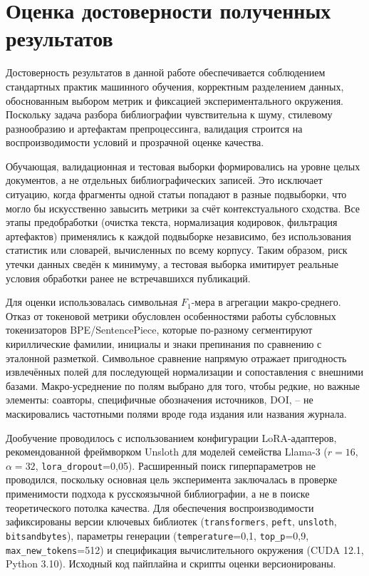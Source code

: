\section{Оценка достоверности полученных результатов}

Достоверность результатов в данной работе обеспечивается соблюдением стандартных практик машинного обучения, корректным разделением данных, обоснованным выбором метрик и фиксацией экспериментального окружения. Поскольку задача разбора библиографии чувствительна к шуму, стилевому разнообразию и артефактам препроцессинга, валидация строится на воспроизводимости условий и прозрачной оценке качества.

Обучающая, валидационная и тестовая выборки формировались на уровне целых документов, а не отдельных библиографических записей. Это исключает ситуацию, когда фрагменты одной статьи попадают в разные подвыборки, что могло бы искусственно завысить метрики за счёт контекстуального сходства. Все этапы предобработки (очистка текста, нормализация кодировок, фильтрация артефактов) применялись к каждой подвыборке независимо, без использования статистик или словарей, вычисленных по всему корпусу. Таким образом, риск утечки данных сведён к минимуму, а тестовая выборка имитирует реальные условия обработки ранее не встречавшихся публикаций.

Для оценки использовалась символьная $F_1$-мера в агрегации макро-среднего. Отказ от токеновой метрики обусловлен особенностями работы субсловных токенизаторов BPE/SentencePiece, которые по-разному сегментируют кириллические фамилии, инициалы и знаки препинания по сравнению с эталонной разметкой. Символьное сравнение напрямую отражает пригодность извлечённых полей для последующей нормализации и сопоставления с внешними базами. Макро-усреднение по полям выбрано для того, чтобы редкие, но важные элементы: соавторы, специфичные обозначения источников, DOI, -- не маскировались частотными полями вроде года издания или названия журнала.

Дообучение проводилось с использованием конфигурации LoRA-адаптеров, рекомендованной фреймворком Unsloth для моделей семейства Llama-3 ($r=16$, $\alpha=32$, \texttt{lora\_dropout}=0,05). Расширенный поиск гиперпараметров не проводился, поскольку основная цель эксперимента заключалась в проверке применимости подхода к русскоязычной библиографии, а не в поиске теоретического потолка качества. Для обеспечения воспроизводимости зафиксированы версии ключевых библиотек (\texttt{transformers}, \texttt{peft}, \texttt{unsloth}, \texttt{bitsandbytes}), параметры генерации (\texttt{temperature}=0,1, \texttt{top\_p}=0,9, \texttt{max\_new\_tokens}=512) и спецификация вычислительного окружения (CUDA 12.1, Python 3.10). Исходный код пайплайна и скрипты оценки версионированы.

